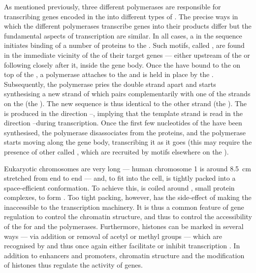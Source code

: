 As mentioned previously, three different polymerases are responsible for
transcribing genes encoded in the \dna into different types of \rna. The precise
ways in which the different polymerases transcribe genes into their \rna
products differ but the fundamental aspects of transcription are similar. In all
cases, a  in the
\dna sequence initiates binding of a number of \tf proteins to the \dna. Such
motifs, called , are found in the immediate vicinity of the
\tss of their target genes --- either upstream of the \tss or following closely
after it, inside the gene body. Once the \tf[s] have bound to the \dna on top of
the \tss, a polymerase attaches to the \dna and is held in place by the \tf[s].
Subsequently, the polymerase pries the double strand apart and starts
synthesising a new strand of \rna which pairs complementarily with one of the
strands on the \dna (the ). The new \rna[’s] sequence is
thus identical to the other \dna strand (the ). The \rna
is produced in the direction \fivep--\threep, implying that the template strand
is read in the direction \threep--\fivep during transcription. Once the first
few nucleotides of the \rna have been synthesised, the polymerase disassociates
from the \tf proteins, and the polymerase starts moving along the gene body,
transcribing it as it goes (this may require the presence of other \tf[s] called
, which are recruited by  motifs elsewhere
on the \dna).

Eukaryotic chromosomes are very long — human chromosome \num{1} is around
\SI{8.5}{\centi\metre} stretched from end to end — and, to fit into the cell, is
tightly packed into a space-efficient conformation. To achieve this, \dna is
coiled around , small protein complexes, to form
. Too tight packing, however, has the
side-effect of making the \dna inaccessible to the transcription machinery. It
is thus a common feature of gene regulation to control the chromatin structure,
and thus to control the accessibility of the \dna for \tf[s] and the
polymerases. Furthermore, histones can be marked in several ways — via addition
or removal of acetyl or methyl groups — which are recognised by \tf[s] and thus
once again either facilitate or inhibit transcription \citep{Alberts:2002}. In
addition to enhancers and promoters, chromatin structure and the modification of
histones thus regulate the activity of genes.

